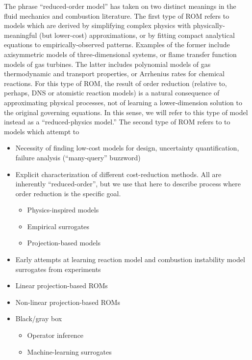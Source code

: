 The phrase ``reduced-order model'' has taken on two distinct meanings in the fluid mechanics and combustion literature. The first type of ROM refers to models which are derived by simplifying complex physics with physically-meaningful (but lower-cost) approximations, or by fitting compact analytical equations to empirically-observed patterns. Examples of the former include axisymmetric models of three-dimensional systems, or flame transfer function models of gas turbines. The latter includes polynomial models of gas thermodynamic and transport properties, or Arrhenius rates for chemical reactions. For this type of ROM, the result of order reduction (relative to, perhaps, DNS or atomistic reaction models) is a natural consequence of approximating physical processes, not of learning a lower-dimension solution to the original governing equations. In this sense, we will refer to this type of model instead as a ``reduced-physics model.'' The second type of ROM refers to to models which attempt to

\begin{itemize}
    \item Necessity of finding low-cost models for design, uncertainty quantification, failure analysis (``many-query'' buzzword)
    \item Explicit characterization of different cost-reduction methods. All are inherently ``reduced-order'', but we use that here to describe process where order reduction is the specific goal.
    \begin{itemize}
        \item Physics-inspired models
        \item Empirical surrogates
        \item Projection-based models
    \end{itemize}
    \item Early attempts at learning reaction model and combustion instability model surrogates from experiments
    \item Linear projection-based ROMs
    \item Non-linear projection-based ROMs
    \item Black/gray box
    \begin{itemize}
        \item Operator inference
        \item Machine-learning surrogates
    \end{itemize}
\end{itemize}
